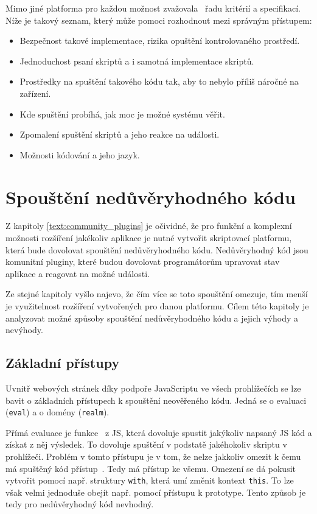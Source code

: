 Mimo jiné platforma pro každou možnost zvažovala~\cite{figma_plugins_blog, figma_website} řadu kritérií a specifikací. 
Níže je takový seznam, který může pomoci rozhodnout mezi správným přístupem:

\begin{itemize}
    \item Bezpečnost takové implementace, rizika opuštění kontrolovaného prostředí.
    \item Jednoduchost psaní skriptů a i samotná implementace skriptů.
    \item Prostředky na spuštění takového kódu tak, aby to nebylo příliš náročné na zařízení.
    \item Kde spuštění probíhá, jak moc je možné systému věřit.
    \item Zpomalení spuštění skriptů a jeho reakce na události.
    \item Možnosti kódování a jeho jazyk.
\end{itemize}

\section{Spouštění nedůvěryhodného kódu}\label{text:anaylza/spousteniNeduveryhodnehoKodu}

Z kapitoly \ref{text:community_plugins} je očividné, že pro funkční a komplexní možnosti rozšíření jakékoliv aplikace je nutné vytvořit skriptovací platformu, která bude dovolovat spouštění nedůvěryhodného kódu.
Nedůvěryhodný kód jsou komunitní pluginy, které budou dovolovat programátorům upravovat stav aplikace a reagovat na možné události.

Ze stejné kapitoly vyšlo najevo, že čím více se toto spouštění omezuje, tím menší je využitelnost rozšíření vytvořených pro danou platformu.
Cílem této kapitoly je analyzovat možné způsoby spouštění nedůvěryhodného kódu a jejich výhody a nevýhody.

\subsection{Základní přístupy}

Uvnitř webových stránek díky podpoře JavaScriptu ve všech prohlížečích se lze bavit o základních přístupech k spouštění neověřeného kódu.
Jedná se o evaluaci (\texttt{eval}) a o domény (\texttt{realm}).

Přímá evaluace je funkce~\cite{eval} z JS, která dovoluje spustit jakýkoliv napsaný JS kód a získat z něj výsledek.
To dovoluje spuštění v podstatě jakéhokoliv skriptu v prohlížeči.
Problém v tomto přístupu je v tom, že nelze jakkoliv omezit k čemu má spuštěný kód přístup~\cite{eval, shadowrealms, figma_plugins_blog}.
Tedy má přístup ke všemu.
Omezení se dá pokusit vytvořit pomocí např. struktury \texttt{with}, která umí změnit kontext \texttt{this}.
To lze však velmi jednoduše obejít např. pomocí přístupu k prototype.
Tento způsob je tedy pro nedůvěryhodný kód nevhodný.

